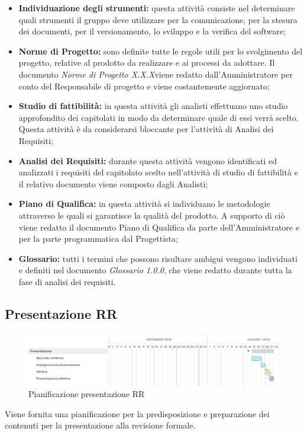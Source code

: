 \begin{itemize}
	\item \textbf{Individuazione degli strumenti:} questa attività consiste nel determinare quali strumenti il gruppo deve utilizzare per la comunicazione, per la stesura dei documenti, per il versionamento, lo sviluppo e la verifica del software;
	\item \textbf{Norme di Progetto:} sono definite tutte le regole utili per lo svolgimento del progetto, relative al prodotto da realizzare e ai processi da adottare. Il documento \textit{Norme di Progetto X.X.X}\doc viene redatto dall'Amministratore per conto del Responsabile di progetto e viene costantemente aggiornato;
	\item \textbf{Studio di fattibilità:} in questa attività gli analisti effettuano uno studio approfondito dei capitolati in modo da determinare quale di essi verrà scelto. Questa attività è da considerarsi bloccante per l’attività di Analisi dei Requisiti;
	\item \textbf{Analisi dei Requisiti:} durante questa attività vengono identificati ed analizzati i requisiti del capitolato scelto nell'attività di studio di fattibilità e il relativo documento viene composto dagli Analisti;
	\item \textbf{Piano di Qualifica:} in questa attività si individuano le metodologie attraverso le quali si garantisce la qualità del prodotto. A supporto di ciò viene redatto il documento Piano di Qualifica da parte dell'Amministratore e per la parte programmatica dal Progettista;
	\item \textbf{Glossario:} tutti i termini che possono risultare ambigui vengono individuati e definiti nel documento \textit{Glossario 1.0.0}\docs, che viene redatto durante tutta la fase di analisi dei requisiti.
\end{itemize}

\newpage
\subsection{Presentazione RR}
\begin{figure}[h!]
	\includegraphics[width=\textwidth]{res/img/g2}
	\caption{Pianificazione presentazione RR}
\end{figure}
Viene fornita una pianificazione per la predisposizione e preparazione dei contenuti per la presentazione alla revisione formale.

